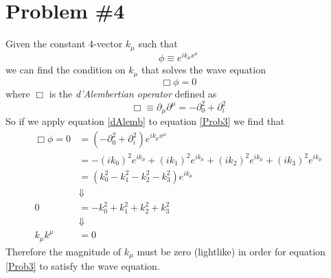 \documentclass[11pt]{article}
\numberwithin{equation}{section}
\begin{document}
\section{Problem \#4}
 Given the constant 4-vector $k_{\mu}$ such that
    \begin{equation}
        \phi\equiv e^{ik_{\mu}x^{\mu}}
        \label{Prob3}
    \end{equation}
    we can find the condition on $k_{\mu}$ that solves the wave equation
    $$\Box\phi=0$$
    where $\Box$ is the \emph{d'Alembertian operator} defined as
    \begin{equation}
        \Box\equiv\partial_{\mu}\partial^{\mu} = -\partial_{0}^{2} + \partial_{i}^{2}
        \label{dAlemb}
    \end{equation}
    So if we apply equation \ref{dAlemb} to equation \ref{Prob3} we find that
    \begin{align*}
        \Box\phi = 0 &= (-\partial_{0}^{2} + \partial_{i}^{2})e^{ik_{\mu}x^{\mu}}\\
                     &= -(ik_0)^2e^{ik_{\mu}} + (ik_1)^2e^{ik_{\mu}}+ (ik_2)^2e^{ik_{\mu}}+ (ik_3)^2e^{ik_{\mu}}\\
                     &= (k_0^2 - k_1^2  - k_2^2 - k_3^2)e^{ik_{\mu}}\\
                     &\Downarrow\\
                   0 &= -k_0^2 + k_1^2  + k_2^2 + k_3^2 \\
                     &\Downarrow\\
        k_{\mu}k^{\mu} &= 0
    \end{align*}
    Therefore the magnitude of $k_{\mu}$ must be zero (lightlike) in order for equation \ref{Prob3} to satisfy the wave equation.
\end{document}
